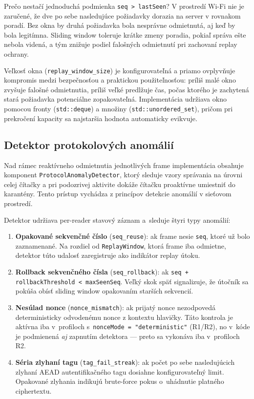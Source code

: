 \documentclass[journal,a4paper,onecolumn]{IEEEtran}
\begin{document}
Prečo nestačí jednoduchá podmienka \texttt{seq > lastSeen}? V prostredí Wi-Fi nie je zaručené, že dve po sebe nasledujúce požiadavky dorazia na server v rovnakom poradí. Bez okna by druhá požiadavka bola nesprávne odmietnutá, aj keď by bola legitímna. Sliding window toleruje krátke zmeny poradia, pokiaľ správa ešte nebola videná, a tým znižuje podiel falošných odmietnutí pri zachovaní replay ochrany.

Veľkosť okna (\texttt{replay\_window\_size}) je konfigurovateľná a priamo ovplyvňuje kompromis medzi bezpečnosťou a praktickou použiteľnosťou: príliš malé okno zvyšuje falošné odmietnutia, príliš veľké predlžuje čas, počas ktorého je zachytená stará požiadavka potenciálne zopakovateľná. Implementácia udržiava okno pomocou fronty (\texttt{std::deque}) a množiny (\texttt{std::unordered\_set}), pričom pri prekročení kapacity sa najstaršia hodnota automaticky evikvuje.


\subsection{Detektor protokolových anomálií}
\label{sec:anomaly_detector}

Nad rámec reaktívneho odmietnutia jednotlivých frame implementácia obsahuje komponent \texttt{ProtocolAnomalyDetector}, ktorý sleduje vzory správania na úrovni celej čítačky a pri podozrivej aktivite dokáže čítačku proaktívne umiestniť do karantény. Tento prístup vychádza z princípov detekcie anomálií v sieťovom prostredí\cite{NIST80094}.

Detektor udržiava per-reader stavový záznam a~sleduje štyri typy anomálií:

\begin{enumerate}[leftmargin=*,itemsep=2pt]
  \item \textbf{Opakované sekvenčné číslo} (\texttt{seq\_reuse}): ak frame nesie \texttt{seq}, ktoré už bolo zaznamenané. Na rozdiel od \texttt{ReplayWindow}, ktorá frame iba odmietne, detektor túto udalosť zaregistruje ako indikátor replay útoku.
  \item \textbf{Rollback sekvenčného čísla} (\texttt{seq\_rollback}): ak \texttt{seq + rollbackThreshold < maxSeenSeq}. Veľký skok späť signalizuje, že útočník sa pokúša obísť sliding window opakovaním starších sekvencií.
  \item \textbf{Nesúlad nonce} (\texttt{nonce\_mismatch}): ak prijatý nonce nezodpovedá deterministicky odvodenému nonce z kontextu hlavičky. Táto kontrola je aktívna iba v~profiloch s~\texttt{nonceMode = "deterministic"} (R1/R2), no v~kóde je podmienená \emph{aj} zapnutím detektora --- preto sa vykonáva iba v~profiloch R2.
  \item \textbf{Séria zlyhaní tagu} (\texttt{tag\_fail\_streak}): ak počet po sebe nasledujúcich zlyhaní AEAD autentifikačného tagu dosiahne konfigurovateľný limit. Opakované zlyhania indikujú brute-force pokus o~uhádnutie platného ciphertextu.
\end{enumerate}
\end{document}
